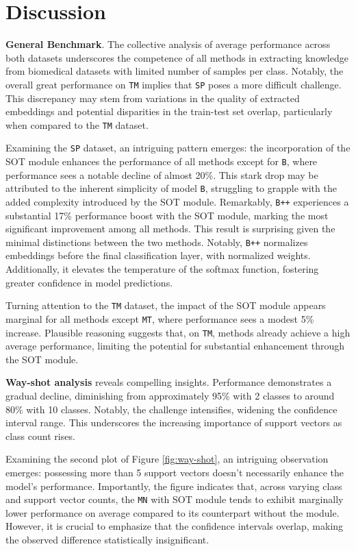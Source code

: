 \section{Discussion}

\textbf{General Benchmark}. The collective analysis of average performance across both datasets underscores the competence 
of all methods in extracting knowledge from biomedical datasets with limited number of samples per class. 
Notably, the overall great performance on \texttt{TM} implies that \texttt{SP} poses a more difficult challenge. 
This discrepancy may stem from variations in the quality of extracted embeddings and potential disparities in the train-test set overlap, 
particularly when compared to the \texttt{TM} dataset.

Examining the \texttt{SP} dataset, an intriguing pattern emerges: the incorporation of the SOT module 
enhances the performance of all methods except for \texttt{B}, where performance sees a notable decline of almost 20\%. 
This stark drop may be attributed to the inherent simplicity of model \texttt{B}, struggling to grapple with the added complexity introduced by the SOT module. 
Remarkably, \texttt{B++} experiences a substantial 17\% performance boost with the SOT module, marking the most significant improvement among all methods. 
This result is surprising given the minimal distinctions between the two methods. 
Notably, \texttt{B++} normalizes embeddings before the final classification layer, with normalized weights. 
Additionally, it elevates the temperature of the softmax function, fostering greater confidence in model predictions.

Turning attention to the \texttt{TM} dataset, the impact of the SOT module appears marginal for all methods except \texttt{MT}, 
where performance sees a modest 5\% increase. Plausible reasoning suggests that, on \texttt{TM}, 
methods already achieve a high average performance, limiting the potential for substantial enhancement through the SOT module.

\textbf{Way-shot analysis} reveals compelling insights. Performance demonstrates a gradual 
decline, diminishing from approximately 95\% with 2 classes to around 80\% with 10 classes. 
Notably, the challenge intensifies, widening the confidence interval range. This underscores 
the increasing importance of support vectors as class count rises.

Examining the second plot of Figure \ref{fig:way-shot}, an intriguing observation emerges: 
possessing more than 5 support vectors doesn't necessarily enhance the model's performance. 
Importantly, the figure indicates that, across varying class and support vector counts, 
the \texttt{MN} with SOT module tends to exhibit marginally lower performance on average compared 
to its counterpart without the module. However, it is crucial to emphasize that the confidence intervals overlap, 
making the observed difference statistically insignificant.
